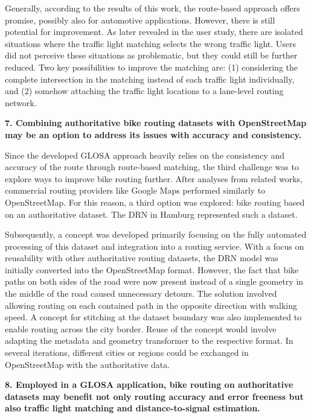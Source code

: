 Generally, according to the results of this work, the route-based approach offers promise, possibly also for automotive applications. However, there is still potential for improvement. As later revealed in the user study, there are isolated situations where the traffic light matching selects the wrong traffic light. Users did not perceive these situations as problematic, but they could still be further reduced. Two key possibilities to improve the matching are: (1) considering the complete intersection in the matching instead of each traffic light individually, and (2) somehow attaching the traffic light locations to a lane-level routing network. 

\textbf{\color{cidarkblue}7. Combining authoritative bike routing datasets with OpenStreetMap may be an option to address its issues with accuracy and consistency.}

Since the developed GLOSA approach heavily relies on the consistency and accuracy of the route through route-based matching, the third challenge was to explore ways to improve bike routing further. After analyses from related works, commercial routing providers like Google Maps performed similarly to OpenStreetMap. For this reason, a third option was explored: bike routing based on an authoritative dataset. The DRN in Hamburg represented such a dataset. 

Subsequently, a concept was developed primarily focusing on the fully automated processing of this dataset and integration into a routing service. With a focus on reusability with other authoritative routing datasets, the DRN model was initially converted into the OpenStreetMap format. However, the fact that bike paths on both sides of the road were now present instead of a single geometry in the middle of the road caused unnecessary detours. The solution involved allowing routing on each contained path in the opposite direction with walking speed. A concept for stitching at the dataset boundary was also implemented to enable routing across the city border. Reuse of the concept would involve adapting the metadata and geometry transformer to the respective format. In several iterations, different cities or regions could be exchanged in OpenStreetMap with the authoritative data.

\textbf{\color{cidarkblue}8. Employed in a GLOSA application, bike routing on authoritative datasets may benefit not only routing accuracy and error freeness but also traffic light matching and distance-to-signal estimation.} 

